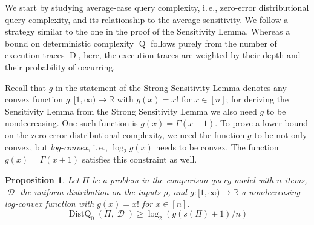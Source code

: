 \documentclass[11pt]{article}
\numberwithin{equation}{section}
\newtheorem{proposition}[theorem]{Proposition}
\theoremstyle{definition}
\theoremstyle{plain}
\newcommand{\ie}{i.\,e.}
\newcommand{\ranking}{\rho}
\DeclareMathOperator{\dist}{\mathcal{D}}
\DeclareMathOperator{\traces}{D}
\DeclareMathOperator{\DQ}{Q}
\DeclareMathOperator{\DistQ}{DistQ}
\begin{document}
We start by studying average-case query complexity, \ie, zero-error distributional query complexity, and its relationship to the average sensitivity. We follow a strategy similar to the one in the proof of the Sensitivity Lemma. Whereas a bound on deterministic complexity $\DQ$ follows purely from the number of execution traces $\traces$, here, the execution traces are weighted by their depth and their probability of occurring.

Recall that $g$ in the statement of the Strong Sensitivity Lemma denotes any convex function $g: [1,\infty) \to \mathbb{R}$ with $g(x) = x!$ for $x \in [n]$; for deriving the Sensitivity Lemma from the Strong Sensitivity Lemma we also need $g$ to be nondecreasing. One such function is $g(x) = \Gamma(x+1)$. To prove a lower bound on the zero-error distributional complexity, we need the function $g$ to be not only convex, but \emph{log-convex}, \ie, $\log_2 g(x)$ needs to be convex. The function $g(x) = \Gamma(x+1)$ satisfies this constraint as well.

\begin{proposition}
	\label{claim:sensitivity:average}
Let $\Pi$ be a problem in the comparison-query model with $n$ items, $\dist$ the uniform distribution on the inputs $\ranking$, and $g: [1,\infty) \to \mathbb{R}$ a nondecreasing log-convex function with $g(x) = x!$ for $x \in [n]$.
\[\DistQ_0(\Pi,\dist)\ge \log_2 (g(s(\Pi)+1)/n) \]
\end{proposition}
\end{document}
